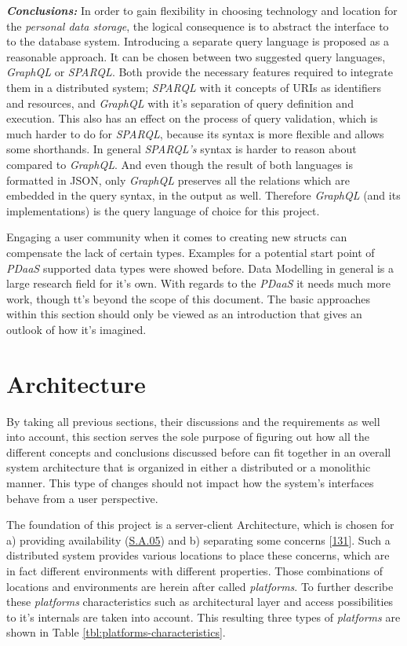 \documentclass[12pt,english,a4paper,titlepage,cleardoublepage=empty,dottedtoc]{report}
\begin{document}
\emph{\textbf{Conclusions:}} In order to gain flexibility in choosing
technology and location for the \emph{personal data storage}, the
logical consequence is to abstract the interface to to the database
system. Introducing a separate query language is proposed as a
reasonable approach. It can be chosen between two suggested query
languages, \emph{GraphQL} or \emph{SPARQL}. Both provide the necessary
features required to integrate them in a distributed system;
\emph{SPARQL} with it concepts of URIs as identifiers and resources, and
\emph{GraphQL} with it's separation of query definition and execution.
This also has an effect on the process of query validation, which is
much harder to do for \emph{SPARQL}, because its syntax is more flexible
and allows some shorthands. In general \emph{SPARQL's} syntax is harder
to reason about compared to \emph{GraphQL}. And even though the result
of both languages is formatted in JSON, only \emph{GraphQL} preserves
all the relations which are embedded in the query syntax, in the output
as well. Therefore \emph{GraphQL} (and its implementations) is the query
language of choice for this project.

Engaging a user community when it comes to creating new structs can
compensate the lack of certain types. Examples for a potential start
point of \emph{PDaaS} supported data types were showed before. Data
Modelling in general is a large research field for it's own. With
regards to the \emph{PDaaS} it needs much more work, though tt's beyond
the scope of this document. The basic approaches within this section
should only be viewed as an introduction that gives an outlook of how
it's imagined.

\section{Architecture}\label{architecture}

By taking all previous sections, their discussions and the requirements
as well into account, this section serves the sole purpose of figuring
out how all the different concepts and conclusions discussed before can
fit together in an overall system architecture that is organized in
either a distributed or a monolithic manner. This type of changes should
not impact how the system's interfaces behave from a user perspective.

The foundation of this project is a server-client Architecture, which is
chosen for a) providing availability (\protect\hyperlink{sa05}{S.A.05})
and b) separating some concerns
{[}\protect\hyperlink{ref-web_2016_wikipedia_separation-of-concerns}{131}{]}.
Such a distributed system provides various locations to place these
concerns, which are in fact different environments with different
properties. Those combinations of locations and environments are herein
after called \emph{platforms}. To further describe these
\emph{platforms} characteristics such as architectural layer and access
possibilities to it's internals are taken into account. This resulting
three types of \emph{platforms} are shown in Table
\ref{tbl:platforms-characteristics}.
\end{document}

